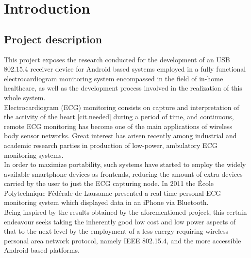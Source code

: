 \chapter{Introduction}
\label{cha:intro}
	\section{Project description}

		This project exposes the research conducted for the development of an USB 802.15.4 receiver device for Android based systems employed in a fully functional electrocardiogram monitoring system encompassed in the field of in-home healthcare, as well as the development process involved in the realization of this whole system.\\ %

		Electrocardiogram (ECG) monitoring consists on capture and interpretation of the activity of the heart [cit.needed] during a period of time, and continuous, remote ECG monitoring has become one of the main applications of wireless body sensor networks. Great interest has arisen recently among industrial and academic research parties in production of low-power, ambulatory ECG monitoring systems.\\

		In order to maximize portability, such systems have started to employ the widely available smartphone devices as frontends, reducing the amount of extra devices carried by the user to just the ECG capturing node. In 2011 the École Polytechnique Fédérale de Lausanne presented a real-time personal ECG monitoring system which displayed data in an iPhone via Bluetooth.\\

		Being inspired by the results obtained by the aforementioned project, this certain  endeavour seeks taking the inherently good low cost and low power aspects of that to the next level by the employment of a less energy requiring wireless personal area network protocol, namely IEEE 802.15.4, and the more accessible Android based platforms.\\


